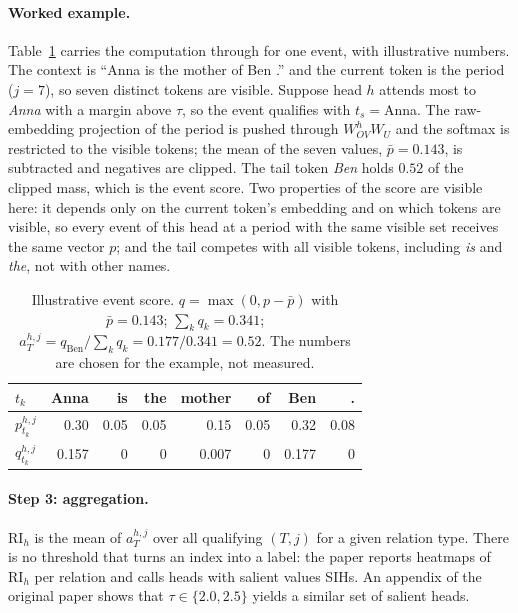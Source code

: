 \paragraph{Worked example.}
Table~\ref{tab:ri-example} carries the computation through for one event, with
illustrative numbers. The context is ``Anna is the mother of Ben .'' and the current
token is the period ($j{=}7$), so seven distinct tokens are visible. Suppose head $h$
attends most to \emph{Anna} with a margin above $\tau$, so the event qualifies with
$t_s{=}$Anna. The raw-embedding projection of the period is pushed through $W^h_{OV}W_U$
and the softmax is restricted to the visible tokens; the mean of the seven values,
$\bar p{=}0.143$, is subtracted and negatives are clipped. The tail token \emph{Ben}
holds $0.52$ of the clipped mass, which is the event score. Two properties of the
score are visible here: it depends only on the current token's embedding and on
which tokens are visible, so every event of this head at a period with the same
visible set receives the same vector $p$; and the tail competes with all visible
tokens, including \emph{is} and \emph{the}, not with other names.

\begin{table}[h]
\centering\scriptsize
\setlength{\tabcolsep}{2pt}
\begin{tabular}{@{}lrrrrrrr@{}}
\toprule
$t_k$ & Anna & is & the & mother & of & Ben & . \\
\midrule
$p^{h,j}_{t_k}$ & 0.30 & 0.05 & 0.05 & 0.15 & 0.05 & 0.32 & 0.08 \\
$q^{h,j}_{t_k}$ & 0.157 & 0 & 0 & 0.007 & 0 & 0.177 & 0 \\
\bottomrule
\end{tabular}
\caption{Illustrative event score. $q=\max(0,p-\bar p)$ with $\bar p=0.143$;
$\sum_k q_k=0.341$; $a^{h,j}_T=q_{\text{Ben}}/\sum_k q_k=0.177/0.341=0.52$. The numbers are chosen for
the example, not measured.}
\label{tab:ri-example}
\end{table}

\paragraph{Step 3: aggregation.}
$\mathrm{RI}_h$ is the mean of $a^{h,j}_T$ over all qualifying $(T,j)$ for a given
relation type. There is no threshold that turns an index into a label: the paper
reports heatmaps of $\mathrm{RI}_h$ per relation and calls heads with salient values
SIHs. An appendix of the original paper shows that $\tau\in\{2.0,2.5\}$ yields a
similar set of salient heads.

